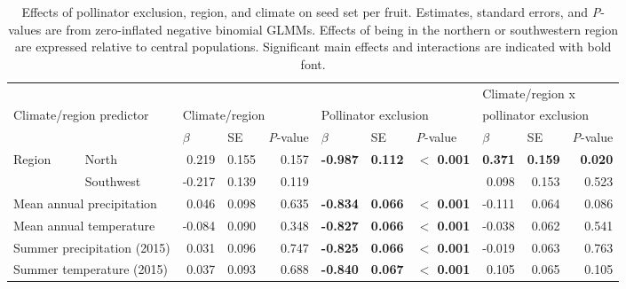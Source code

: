 \documentclass{article}
\begin{document}


\clearpage



\begin{landscape}
\begin{table}[p]
\centering
\caption[Effects of pollinator exclusion, region, and climate on seed set per fruit.]{Effects of pollinator exclusion, region, and climate on seed set per fruit. Estimates, standard errors, and \textit{P}-values are from zero-inflated negative binomial GLMMs. Effects of being in the northern or southwestern region are expressed relative to central populations. Significant main effects and interactions are indicated with bold font.}
\label{seedstable}
\begin{tabular}{llrrrrrrrrr}
\toprule
                            &                     &  & &                        &  &  &   & \multicolumn{3}{l}{Climate/region x}           \\
\multicolumn{2}{l}{Climate/region predictor}          & \multicolumn{3}{l}{Climate/region} &    \multicolumn{3}{l}{Pollinator exclusion}                               & \multicolumn{3}{l}{pollinator exclusion} \\
                            &                     & \multicolumn{1}{l}{$\beta$} & \multicolumn{1}{l}{SE} & \multicolumn{1}{l}{\textit{P}-value} &  \multicolumn{1}{l}{$\beta$}  & \multicolumn{1}{l}{SE} &  \multicolumn{1}{l}{\textit{P}-value} &  \multicolumn{1}{l}{$\beta$}  & \multicolumn{1}{l}{SE} &  \multicolumn{1}{l}{\textit{P}-value} \\
\midrule
\multirow{2}{*}{Region}     & North               & 0.219    & 0.155    & 0.157       & \multirow{2}{*}{\textbf{-0.987}} & \multirow{2}{*}{\textbf{0.112}} & \multirow{2}{*}{\textbf{$<$ 0.001}} & \textbf{0.371} & \textbf{0.159} & \textbf{0.020} \\
                            & Southwest           & -0.217   & 0.139    & 0.119       &        &       &                         & 0.098        & 0.153      & 0.523        \\
\midrule
\multicolumn{2}{l}{Mean annual precipitation}     & 0.046    & 0.098    & 0.635       & \textbf{-0.834} & \textbf{0.066} & \textbf{$<$ 0.001}               & -0.111       & 0.064      & 0.086        \\
\multicolumn{2}{l}{Mean annual temperature}       & -0.084   & 0.090    & 0.348       & \textbf{-0.827} & \textbf{0.066} & \textbf{$<$ 0.001}               & -0.038       & 0.062      & 0.541        \\
\multicolumn{2}{l}{Summer precipitation (2015)}   & 0.031    & 0.096    & 0.747       & \textbf{-0.825} & \textbf{0.066} & \textbf{$<$ 0.001}               & -0.019       & 0.063      & 0.763        \\
\multicolumn{2}{l}{Summer temperature (2015)}     & 0.037    & 0.093    & 0.688       & \textbf{-0.840} & \textbf{0.067} & \textbf{$<$ 0.001}               & 0.105        & 0.065      & 0.105        \\
\bottomrule
\end{tabular}
\end{table}



\end{landscape}
\end{document}
